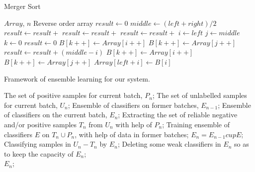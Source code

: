 \documentclass{article}
\begin{document}
		\begin{algorithm}
			\caption{Merger Sort}
			\begin{algorithmic}[1] %
				\Require $Array$, $n$
				\Ensure Reverse order array
				\State $result \gets 0$
				\State $middle \gets (left + right) / 2$
				\State $result \gets result +$ 
				\State $result \gets result +$ 
				\State $result \gets result +$ 
				\EndIf
				\State {}
				\EndFunction
				\State
				\State $i\gets left$
				\State $j\gets middle$
				\State $k\gets 0$
				\State $result \gets 0$
				\State $B[k++]\gets Array[i++]$
				\Else
				\State $B[k++] \gets Array[j++]$
				\State $result \gets result + (middle - i)$
				\EndIf
				\EndWhile
				\State $B[k++] \gets Array[i++]$
				\EndWhile
				\State $B[k++] \gets Array[j++]$
				\EndWhile
				\State $Array[left + i] \gets B[i]$
				\EndFor
				\State {}
				\EndFunction
			\end{algorithmic}
		\end{algorithm}
	
	
	
\begin{algorithm}[htb]  
	\caption{ Framework of ensemble learning for our system.}  
	\label{alg:Framwork}  
	\begin{algorithmic}[1]  
		\Require  
		The set of positive samples for current batch, $P_n$;  
		The set of unlabelled samples for current batch, $U_n$;  
		Ensemble of classifiers on former batches, $E_{n-1}$;  
		\Ensure  
		Ensemble of classifiers on the current batch, $E_n$;  
		\State Extracting the set of reliable negative and/or positive samples $T_n$ from $U_n$ with help of $P_n$;  
		\label{code:fram:extract}  
		\State Training ensemble of classifiers $E$ on $T_n \cup P_n$, with help of data in former batches;  
		\label{code:fram:trainbase}  
		\State $E_n=E_{n-1}cup E$;  
		\label{code:fram:add}  
		\State Classifying samples in $U_n-T_n$ by $E_n$;  
		\label{code:fram:classify}  
		\State Deleting some weak classifiers in $E_n$ so as to keep the capacity of $E_n$;  
		\label{code:fram:select} \\  
		\Return $E_n$;  
	\end{algorithmic}  
\end{algorithm}  	
	
\end{document}
